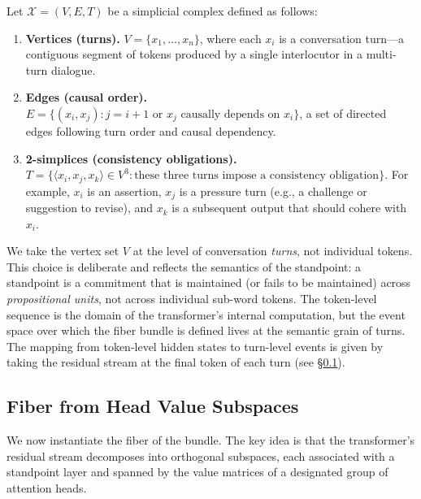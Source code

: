 \begin{definition}
\label{def:event-space}
Let $\mathcal{X} = (V, E, T)$ be a simplicial complex defined as follows:
\begin{enumerate}
    \item \textbf{Vertices (turns).} $V = \{x_1, \ldots, x_n\}$, where each $x_i$ is a
    conversation turn---a contiguous segment of tokens produced by a single interlocutor
    in a multi-turn dialogue.
    \item \textbf{Edges (causal order).} $E = \{(x_i, x_j) : j = i+1 \text{ or } x_j
    \text{ causally depends on } x_i\}$, a set of directed edges following turn order and
    causal dependency.
    \item \textbf{2-simplices (consistency obligations).} $T = \{\langle x_i, x_j, x_k
    \rangle \in V^3 : \text{these three turns impose a consistency obligation}\}$. For
    example, $x_i$ is an assertion, $x_j$ is a pressure turn (e.g., a challenge or
    suggestion to revise), and $x_k$ is a subsequent output that should cohere with $x_i$.
\end{enumerate}
\end{definition}

\begin{remark}
\label{rem:turn-granularity}
We take the vertex set $V$ at the level of conversation \emph{turns}, not individual
tokens. This choice is deliberate and reflects the semantics of the standpoint: a
standpoint is a commitment that is maintained (or fails to be maintained) across
\emph{propositional units}, not across individual sub-word tokens. The token-level
sequence is the domain of the transformer's internal computation, but the event space
over which the fiber bundle is defined lives at the semantic grain of turns. The mapping
from token-level hidden states to turn-level events is given by taking the residual
stream at the final token of each turn (see \S\ref{sec:fiber}).
\end{remark}

\subsection{Fiber from Head Value Subspaces}
\label{sec:fiber}

We now instantiate the fiber of the bundle. The key idea is that the transformer's
residual stream decomposes into orthogonal subspaces, each associated with a standpoint
layer and spanned by the value matrices of a designated group of attention heads.

